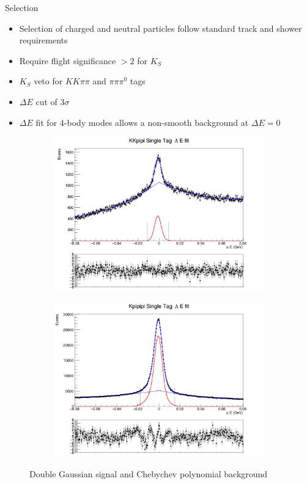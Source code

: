 \documentclass{beamer}
\begin{document}
\begin{frame}{Selection}
  \begin{itemize}
    \item{Selection of charged and neutral particles follow standard track and shower requirements}
    \item{Require flight significance $> 2$ for $K_S$}
    \item{$K_S$ veto for $KK\pi\pi$ and $\pi\pi\pi^0$ tags}
    \item{$\Delta E$ cut of $3\sigma$}
    \item{$\Delta E$ fit for 4-body modes allows a non-smooth background at $\Delta E = 0$}
  \end{itemize}
  \begin{figure}
    \centering
    \begin{subfigure}{0.5\textwidth}
      \centering
      \includegraphics[width=\textwidth, clip = true, trim = {0 11cm 0 0 }]{Plots/KKpipi_SingleTag_DeltaE_Plot.png}
    \end{subfigure}%
    \begin{subfigure}{0.5\textwidth}
      \centering
      \includegraphics[width=\textwidth, clip = true, trim = {0 11cm 0 0 }]{Plots/Kpipipi_SingleTag_DeltaE_Plot.png}
    \end{subfigure}
    \caption{Double Gaussian signal and Chebychev polynomial background}
  \end{figure}
\end{frame}
\end{document}

